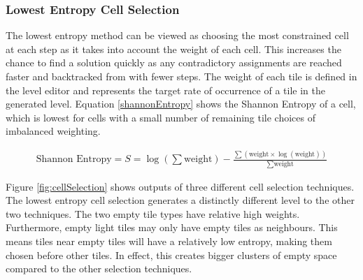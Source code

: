 \subsubsection{Lowest Entropy Cell Selection}
The lowest entropy method can be viewed as choosing the most constrained cell at each step as it takes into account the weight of each cell. This increases the chance to find a solution quickly as any contradictory assignments are reached faster and backtracked from with fewer steps. The weight of each tile is defined in the level editor and represents the target rate of occurrence of a tile in the generated level. Equation \ref{shannonEntropy} shows the Shannon Entropy of a cell, which is lowest for cells with a small number of remaining tile choices of imbalanced weighting.%

\begin{align}
    \label{shannonEntropy}
    \text{Shannon Entropy}=S=\log(\sum{\text{weight}}) - \frac{\sum\left(\text{weight} \times \log(\text{weight})\right)}{\sum{\text{weight}}}
\end{align}

Figure \ref{fig:cellSelection} shows outputs of three different cell selection techniques. The lowest entropy cell selection generates a distinctly different level to the other two techniques. The two empty tile types have relative high weights. Furthermore, empty light tiles may only have empty tiles as neighbours. This means tiles near empty tiles will have a relatively low entropy, making them chosen before other tiles. In effect, this creates bigger clusters of empty space compared to the other selection techniques.%

